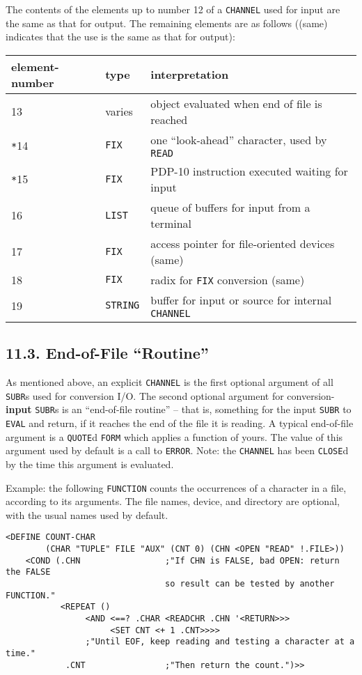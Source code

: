 \documentclass[a4paper,]{article}
\begin{document}
The contents of the elements up to number 12 of a \texttt{CHANNEL} used for input are the same as that for output. The
remaining elements are as follows ((same) indicates that the use is the same as that for output):

\begin{longtable}[]{@{}lll@{}}
\toprule
element-number & type & interpretation\tabularnewline
\midrule
\endhead
13 & varies & object evaluated when end of file is reached\tabularnewline
\texttt{*}14 & \texttt{FIX} & one ``look-ahead'' character, used by \texttt{READ}\tabularnewline
\texttt{*}15 & \texttt{FIX} & PDP-10 instruction executed waiting for input\tabularnewline
16 & \texttt{LIST} & queue of buffers for input from a terminal\tabularnewline
17 & \texttt{FIX} & access pointer for file-oriented devices (same)\tabularnewline
18 & \texttt{FIX} & radix for \texttt{FIX} conversion (same)\tabularnewline
19 & \texttt{STRING} & buffer for input or source for internal \texttt{CHANNEL}\tabularnewline
\bottomrule
\end{longtable}

\subsection{\texorpdfstring{11.3. End-of-File ``Routine''}{11.3. End-of-File Routine}}\label{end-of-file-routine}

As mentioned above, an explicit \texttt{CHANNEL} is the first optional argument of all \texttt{SUBR}s used for conversion
I/O. The second optional argument for conversion-\textbf{input} \texttt{SUBR}s is an ``end-of-file routine'' -- that is,
something for the input \texttt{SUBR} to \texttt{EVAL} and return, if it reaches the end of the file it is reading. A
typical end-of-file argument is a \texttt{QUOTE}d \texttt{FORM} which applies a function of yours. The value of this
argument used by default is a call to \texttt{ERROR}. Note: the \texttt{CHANNEL} has been \texttt{CLOSE}d by the time this
argument is evaluated.

Example: the following \texttt{FUNCTION} counts the occurrences of a character in a file, according to its arguments. The
file names, device, and directory are optional, with the usual names used by default. 
   

\begin{verbatim}
<DEFINE COUNT-CHAR
        (CHAR "TUPLE" FILE "AUX" (CNT 0) (CHN <OPEN "READ" !.FILE>))
    <COND (.CHN                 ;"If CHN is FALSE, bad OPEN: return the FALSE
                                so result can be tested by another FUNCTION."
           <REPEAT ()
                <AND <==? .CHAR <READCHR .CHN '<RETURN>>>
                     <SET CNT <+ 1 .CNT>>>>
                ;"Until EOF, keep reading and testing a character at a time."
            .CNT                ;"Then return the count.")>>
\end{verbatim}
\end{document}
